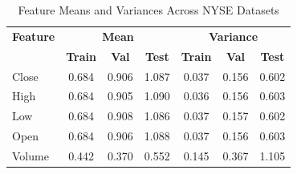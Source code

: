 \begin{table}[H]
    \centering
    \small
    \begin{tabular}{l|ccc|ccc}
        \toprule
        \textbf{Feature} & \multicolumn{3}{c|}{\textbf{Mean}} & \multicolumn{3}{c}{\textbf{Variance}} \\
        & \textbf{Train} & \textbf{Val} & \textbf{Test} & \textbf{Train} & \textbf{Val} & \textbf{Test} \\
        \midrule
        Close           & 0.684 & 0.906 & 1.087 & 0.037 & 0.156 & 0.602 \\
        High            & 0.684 & 0.905 & 1.090 & 0.036 & 0.156 & 0.603 \\
        Low             & 0.684 & 0.908 & 1.086 & 0.037 & 0.157 & 0.602 \\
        Open            & 0.684 & 0.906 & 1.088 & 0.037 & 0.156 & 0.603 \\
        Volume          & 0.442 & 0.370 & 0.552 & 0.145 & 0.367 & 1.105 \\
        \bottomrule
    \end{tabular}
    \caption{Feature Means and Variances Across NYSE Datasets}
    \label{tab:nyse_feature_stats}
\end{table}